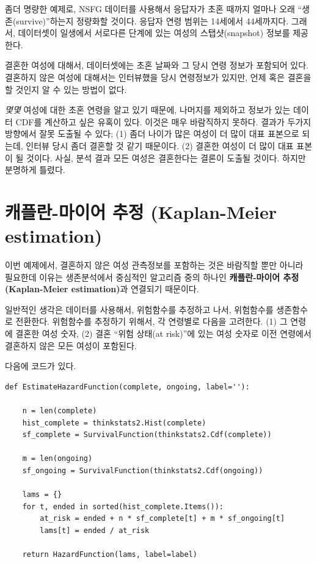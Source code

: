 좀더 명량한 예제로, NSFG 데이터를 사용해서 응답자가 초혼 때까지 얼마나 오래 ``생존(survive)''하는지 정량화할 것이다. 
응답자 연령 범위는 14세에서 44세까지다. 그래서, 데이터셋이 일생에서 서로다른 단계에 있는 여성의 스탭샷(snapshot) 정보를 제공한다. 


결혼한 여성에 대해서, 데이터셋에는 초혼 날짜와 그 당시 연령 정보가 포함되어 있다. 결혼하지 않은 여성에 대해서는 인터뷰했을 당시 연령정보가 있지만, 언제 혹은 결혼을 할 것인지 알 수 있는 방법이 없다.


{\em 몇몇} 여성에 대한 초혼 연령을 알고 있기 때문에, 나머지를 제외하고 정보가 있는 데이터 CDF를 계산하고 싶은 유혹이 있다. 이것은 매우 바람직하지 못하다. 결과가 두가지 방향에서 잘못 도출될 수 있다; (1) 좀더 나이가 많은 여성이 더 많이 대표 표본으로 되는데, 인터뷰 당시 좀더 결혼할 것 같기 때문이다. (2) 결혼한 여성이 더 많이 대표 표본이 될 것이다. 사실, 분석 결과 모든 여성은 결혼한다는 결론이 도출될 것이다. 하지만 분명하게 틀렸다.


\section{캐플란-마이어 추정 (Kaplan-Meier estimation)}

이번 예제에서, 결혼하지 않은 여성 관측정보를 포함하는 것은 바람직할 뿐만 아니라 필요한데 이유는 생존분석에서 중심적인 알고리즘 중의 하나인 {\bf 캐플란-마이어 추정(Kaplan-Meier estimation)}과 연결되기 때문이다.

일반적인 생각은 데이터를 사용해서, 위험함수를 추정하고 나서, 위험함수를 생존함수로 전환한다. 위험함수를 추정하기 위해서, 각 연령별로 다음을 고려한다. (1) 그 연령에 결혼한 여성 숫자, (2) 결혼 ``위험 상태(at risk)''에 있는 여성 숫자로 이전 연령에서 결혼하지 않은 모든 여성이 포함된다.


다음에 코드가 있다.

\begin{verbatim}
def EstimateHazardFunction(complete, ongoing, label=''):

    n = len(complete)
    hist_complete = thinkstats2.Hist(complete)
    sf_complete = SurvivalFunction(thinkstats2.Cdf(complete))

    m = len(ongoing)
    sf_ongoing = SurvivalFunction(thinkstats2.Cdf(ongoing))

    lams = {}
    for t, ended in sorted(hist_complete.Items()):
        at_risk = ended + n * sf_complete[t] + m * sf_ongoing[t]
        lams[t] = ended / at_risk

    return HazardFunction(lams, label=label)
\end{verbatim}

